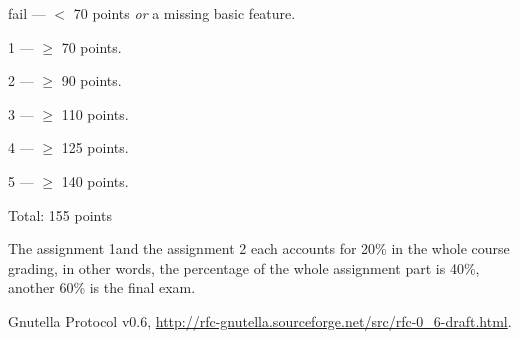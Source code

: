 \documentclass[12pt, a4paper]{article}
\begin{document}
fail --- $<$ 70 points \emph{or} a missing basic feature.

1 --- $\ge$ 70 points.

2 --- $\ge$  90 points.

3 --- $\ge$ 110 points.

4 --- $\ge$ 125 points.

5 --- $\ge$  140 points.

Total: 155 points

The assignment 1and the assignment 2 each accounts for 20\% in the whole course grading, in other words, the percentage of the whole assignment part is 40\%, another 60\% is the final exam.
\begin{thebibliography}{1}

Gnutella Protocol v0.6, \url{http://rfc-gnutella.sourceforge.net/src/rfc-0\_6-draft.html}.

\end{thebibliography}
\end{document}
